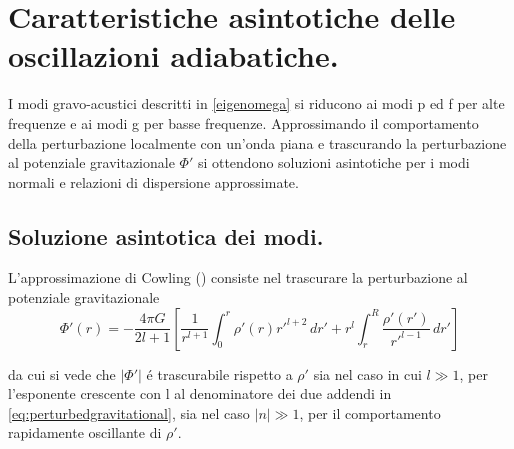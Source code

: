 \documentclass[../main.tex]{subfiles}
\begin{document}

\begin{workout}

\end{workout}


{\makeatletter\let\ps@chapter\ps@plain\makeatother
\let\clearpage\relax\let\cleardoublepage\relax%
\chapter{Caratteristiche asintotiche delle oscillazioni adiabatiche.}\label{chap:asyntoticbehavour}
}

\begin{workout}

\end{workout}

I modi gravo-acustici descritti in \eqref{eigenomega} si riducono ai modi p ed f per alte frequenze e ai modi g per basse frequenze. Approssimando il comportamento della perturbazione localmente con un'onda piana e trascurando la perturbazione al potenziale gravitazionale $\Phi'$ si ottendono soluzioni asintotiche per i modi normali e relazioni di dispersione approssimate.

\section{Soluzione asintotica dei modi.}

L'approssimazione di Cowling (\cite{cow41oscillations}) consiste nel trascurare la perturbazione al potenziale gravitazionale
\begin{equation}
\Phi'(r)=-\frac{4\pi G}{2l+1}\left[\frac{1}{r^{l+1}}\int_0^r\rho'(r)r'^{l+2}\,dr'+r^l\int_r^R\frac{\rho'(r')}{r'^{l-1}}\,dr'\right]\label{eq:perturbedgravitational}
\end{equation}

da cui si vede che $|\Phi'|$ \'e trascurabile rispetto a $\rho'$ sia nel caso in cui $l\gg1$, per l'esponente crescente con l al denominatore dei due addendi in \eqref{eq:perturbedgravitational}, sia nel caso $|n|\gg1$, per il comportamento rapidamente oscillante di $\rho'$.
\end{document}
